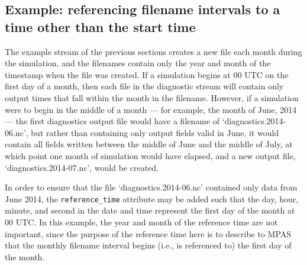 \subsection{Example: referencing filename intervals to a time other than the start time}
\label{sec:reference_time_example}

The example stream of the previous sections creates a new file each month during the simulation, and the filenames
contain only the year and month of the timestamp when the file was created. If a simulation begins at 00 UTC on the
first day of a month, then each file in the diagnostic stream will contain only output times that fall within the month
in the filename. However, if a simulation were to begin in the middle of a month --- for example, the month of June, 2014 --- 
the first diagnostics output file would have a filename of `diagnostics.2014-06.nc', but rather than containing only output
fields valid in June, it would contain all fields written between the middle of June and the middle of July, at which point
one month of simulation would have elapsed, and a new output file, `diagnostics.2014-07.nc', would be created.

In order to ensure that the file `diagnostics.2014-06.nc' contained only data from June 2014, the {\tt reference\_time}
attribute may be added such that the day, hour, minute, and second in the date and time represent the first day of the month
at 00 UTC. In this example, the year and month of the reference time are not important, since the purpose of the reference time
here is to describe to MPAS that the monthly filename interval begins (i.e., is referenced to) the first day of the month.

